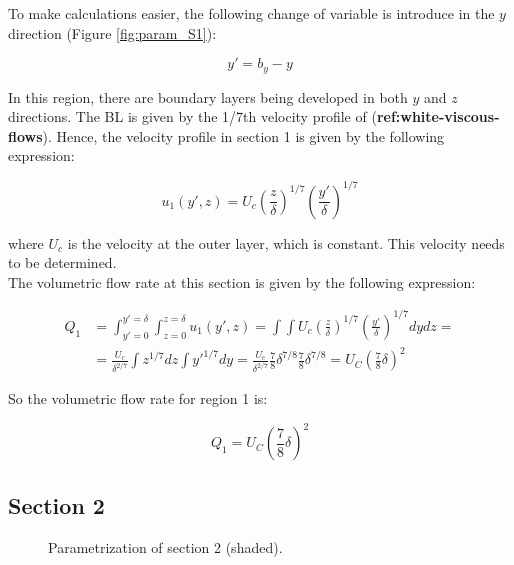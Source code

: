 To make calculations easier, the following change of variable is introduce in the $y$ direction (Figure \ref{fig:param_S1}):

\begin{equation}
\label{eq:zone1_change_of_variable}
y' = b_y - y
\end{equation}

In this region, there are boundary layers being developed in both $y$ and $z$ directions. The BL is given by the 1/7th velocity profile of (\textbf{ref:white-viscous-flows}). Hence, the velocity profile in section 1 is given by the following expression:

\begin{equation}
\label{eq:3DBL_profile_u1}
\boxed{
u_1 \left( y', z \right) = U_c \left( \frac{z}{\delta} \right)^{1/7} \left( \frac{y'}{\delta} \right)^{1/7}
}
\end{equation}

where $U_c$ is the velocity at the outer layer, which is constant. This velocity needs to be determined. \\

The volumetric flow rate at this section is given by the following expression:

\begin{equation}
\begin{split}
Q_1 &= \int_{y'=0}^{y'=\delta} \int_{z=0}^{z=\delta} u_1 \left( y', z  \right) = \int \int U_c \left( \frac{z}{\delta} \right)^{1/7} \left( \frac{y'}{\delta} \right)^{1/7} dy dz = \\
&= \frac{U_c}{\delta^{2/7}} \int z^{1/7} dz \int y'^{1/7} dy = \frac{U_c}{\delta^{2/7}} \frac{7}{8} \delta^{7/8} \frac{7}{8} \delta^{7/8} = U_C \left( \frac{7}{8} \delta \right)^2
\end{split}
\end{equation}

So the volumetric flow rate for region 1 is:

\begin{equation}
\label{eq:3DBL_Q1}
\boxed{
Q_1 = U_C \left( \frac{7}{8} \delta \right)^2
}
\end{equation}


\subsection*{Section 2}

\begin{figure}[h!]	
	\centering
%	
	\caption{Parametrization of section 2 (shaded).}
	\label{fig:param_S2}
\end{figure}

